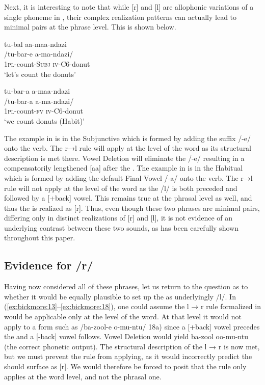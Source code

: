 \documentclass[output=paper
,newtxmath
,modfonts
,nonflat]{langsci/langscibook}
\begin{document}
Next, it is interesting to note that while [r] and [l] are allophonic variations of a single phoneme in , their complex realization%
%
 patterns can actually lead to minimal pairs at the phrase level. This is shown below.

\ea\label{ex:bickmore:22}
\glll    tu-bal aa-maa-ndazi\\
    /tu-bar-e a-ma-ndazi/	\\
\textsc{1pl-}\textup{count}\textsc{{}-Subj} \textsc{iv-C6-}\textup{donut}\\
\glt    ‘let’s count the donuts’
\z

\ea\label{ex:bickmore:23}
\glll    tu-bar-a a-maa-ndazi\\
    /tu-bar-a a-ma-ndazi/	\\
\textsc{1pl-}\textup{count}\textsc{{}-fv} \textsc{iv-C6-}\textup{donut}\\
\glt    ‘we count donuts (Habit)’
\z


The example in  is in the Subjunctive which is formed by adding the suffix /-e/ onto the verb. The r→l rule will apply at the level of the word as its structural description is met there. Vowel Deletion will eliminate the /-e/ resulting in a compensatorily lengthened [aa] after the . The example in  is in the Habitual which is formed by adding the default Final Vowel /-a/ onto the verb. The r→l rule will not apply at the level of the word as the /l/ is both preceded and followed by a [+back] vowel. This remains true at the phrasal level as well, and thus the  is realized as [r]. Thus, even though these two phrases are minimal pairs, differing only in distinct realizations of [r] and [l], it is not evidence of an underlying contrast between these two sounds, as has been carefully shown throughout this paper.

\subsection{Evidence for /r/}\label{sec:bickmore:2.3}

Having now considered all of these phrases, let us return to the question as to whether it would be equally plausible to set up the  as underlyingly /l/. In (\ref{ex:bickmore:13}--\ref{ex:bickmore:18}), one could assume the l → r rule formalized in  would be applicable only at the level of the word. At that level it would not apply to a form such as /ba-zool-e o-mu-ntu/ 18a) since a [+back] vowel precedes the  and a [-back] vowel follows. Vowel Deletion would yield ba-zool oo-mu-ntu (the correct phonetic output). The structural description of the l → r is now met, but we must prevent the rule from applying, as it would incorrectly predict the  should surface as [r]. We would therefore be forced to posit that the rule only applies at the word level, and not the phrasal one.
\end{document}
